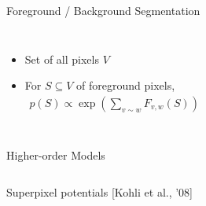 \documentclass[mathserif]{beamer}
\newcommand{\qcite}[1]{{\scriptsize\color{col2}[#1]}}
\begin{document}
\begin{frame}{Foreground / Background Segmentation}
\begin{columns}[c]
{\vspace{0.5em}
\begin{itemize}
\item<5-> Set of all pixels $V$
\vspace{1em}
\item<6-> For $S \subseteq V$ of foreground pixels,
\begin{align*}
p(S) \propto \exp\left(\sum_{v \sim w} F_{v, w}(S)\right)
\end{align*}
\end{itemize}
}
\end{columns}
\end{frame}

\begin{frame}{Higher-order Models}
\vspace{0.5em}
\begin{columns}[c]
\centering
{}%

\vspace{0.5em}
\centering
{\small Superpixel potentials} \qcite{Kohli et al., '08}


\end{columns}
\end{frame}
\end{document}
